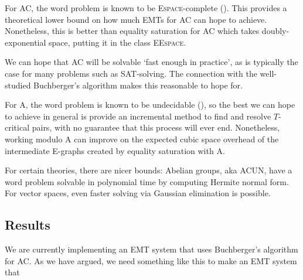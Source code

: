 \documentclass{article}
\theoremstyle{definition}
\begin{document}
For AC, the word problem is known to be \textsc{Espace}-complete (\citep{mayr_complexity_1982_short}). This provides a theoretical lower bound on how much EMTs for AC can hope to achieve. Nonetheless, this is better than equality saturation for AC which takes doubly-exponential space, putting it in the class \textsc{EEspace}.

We can hope that AC will be solvable `fast enough in practice', as is typically the case for many problems such as SAT-solving. The connection with the well-studied Buchberger's algorithm makes this reasonable to hope for.

For A, the word problem is known to be undecidable (\citep{nyberg-brodda_g_2024_short}), so the best we can hope to achieve in general is provide an incremental method to find and resolve $T$-critical pairs, with no guarantee that this process will ever end. Nonetheless, working modulo A can improve on the expected cubic space overhead of the intermediate E-graphs created by equality saturation with A.

For certain theories, there are nicer bounds: Abelian groups, aka ACUN, have a word problem solvable in polynomial time by computing Hermite normal form. For vector spaces, even faster solving via Gaussian elimination is possible.

\subsection{Results}
We are currently implementing an EMT system that uses Buchberger's algorithm for AC. As we have argued, we need something like this to make an EMT system that 

\printbibliography
\end{document}
